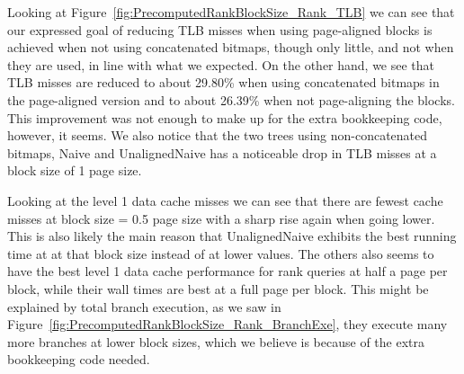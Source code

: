 Looking at Figure~\ref{fig:PrecomputedRankBlockSize_Rank_TLB} we can see that our expressed goal of reducing TLB misses when using page-aligned blocks is achieved when not using concatenated bitmaps, though only little, and not when they are used, in line with what we expected.
On the other hand, we see that TLB misses are reduced to about 29.80\% when using concatenated bitmaps in the page-aligned version and to about 26.39\% when not page-aligning the blocks.
This improvement was not enough to make up for the extra bookkeeping code, however, it seems.
We also notice that the two trees using non-concatenated bitmaps, Naive and UnalignedNaive has a noticeable drop in TLB misses at a block size of 1 page size.


Looking at the level 1 data cache misses we can see that there are fewest cache misses at block size = 0.5 page size with a sharp rise again when going lower.
This is also likely the main reason that UnalignedNaive exhibits the best running time at at that block size instead of at lower values.
The others also seems to have the best level 1 data cache performance for rank queries at half a page per block, while their wall times are best at a full page per block.
This might be explained by total branch execution, as we saw in Figure~\ref{fig:PrecomputedRankBlockSize_Rank_BranchExe}, they execute many more branches at lower block sizes, which we believe is because of the extra bookkeeping code needed.

